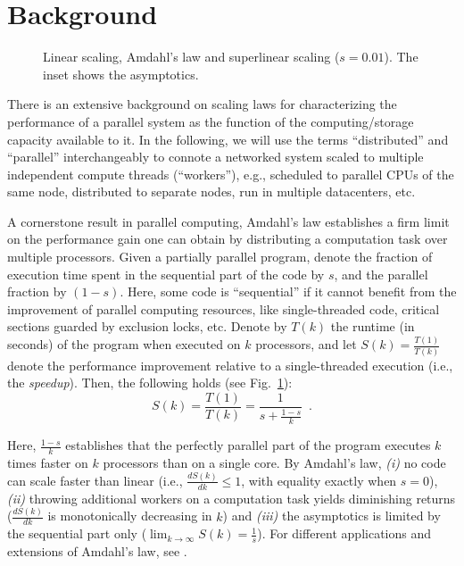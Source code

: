 \section{Background}\label{sec:background}

\begin{figure}[t]
  \centering
  \begin{small}
    
  \end{small}
  \caption{Linear scaling, Amdahl's law and superlinear scaling ($s=0.01$). The inset shows the asymptotics.}
    \label{fig:amdahl}
\end{figure}

There is an extensive background on scaling laws for characterizing the performance of a parallel system as the function of the computing\slash storage capacity available to it. In the following, we will use the terms ``distributed'' and ``parallel'' interchangeably to connote a networked system scaled to multiple independent compute threads (``workers''), e.g., scheduled to parallel CPUs of the same node, distributed to separate nodes, run in multiple datacenters, etc.

A cornerstone result in parallel computing, Amdahl's law \cite{10.1145/1465482.1465560} establishes a firm limit on the performance gain one can obtain by distributing a computation task over multiple processors. Given a partially parallel program, denote the fraction of execution time spent in the sequential part of the code by $s$, and the parallel fraction by $(1-s)$. Here, some code is ``sequential'' if it cannot benefit from the improvement of parallel computing resources, like single-threaded code, critical sections guarded by exclusion locks, etc. Denote by $T(k)$ the runtime (in seconds) of the program when executed on $k$ processors, and let $S(k)=\frac{T(1)}{T(k)}$ denote the performance improvement relative to a single-threaded execution (i.e., the \emph{speedup}). Then, the following holds (see Fig.~\ref{fig:amdahl}):
\begin{equation}\label{eq:amdahl}
S(k) = \frac{T(1)}{T(k)} = \frac{1}{s + \frac{1-s}{k}} \enspace .
\end{equation}

Here, $\frac{1-s}{k}$ establishes that the perfectly parallel part of the program executes $k$ times faster on $k$ processors than on a single core. By Amdahl's law, \emph{(i)} no code can scale faster than linear (i.e., $\frac{d S(k)}{d k} \le 1$, with equality exactly when $s=0$), \emph{(ii)} throwing additional workers on a computation task yields diminishing returns ($\frac{d S(k)}{d k}$ is monotonically decreasing in $k$) and \emph{(iii)} the asymptotics is limited by the sequential part only ($\lim_{k\to \infty}S(k) = \frac1{s}$). For different applications and extensions of Amdahl's law, see \cite{4563876, 6280307,1580395,406581,6163449, 10.5555/1951599}.

